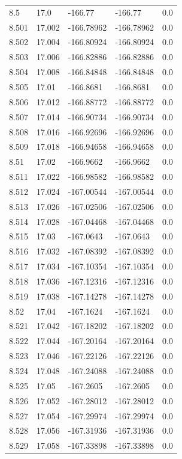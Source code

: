 \begin{tabular}{lllll}
8.5 & 17.0 & -166.77 & -166.77 & 0.0 \\
8.501 & 17.002 & -166.78962 & -166.78962 & 0.0 \\
8.502 & 17.004 & -166.80924 & -166.80924 & 0.0 \\
8.503 & 17.006 & -166.82886 & -166.82886 & 0.0 \\
8.504 & 17.008 & -166.84848 & -166.84848 & 0.0 \\
8.505 & 17.01 & -166.8681 & -166.8681 & 0.0 \\
8.506 & 17.012 & -166.88772 & -166.88772 & 0.0 \\
8.507 & 17.014 & -166.90734 & -166.90734 & 0.0 \\
8.508 & 17.016 & -166.92696 & -166.92696 & 0.0 \\
8.509 & 17.018 & -166.94658 & -166.94658 & 0.0 \\
8.51 & 17.02 & -166.9662 & -166.9662 & 0.0 \\
8.511 & 17.022 & -166.98582 & -166.98582 & 0.0 \\
8.512 & 17.024 & -167.00544 & -167.00544 & 0.0 \\
8.513 & 17.026 & -167.02506 & -167.02506 & 0.0 \\
8.514 & 17.028 & -167.04468 & -167.04468 & 0.0 \\
8.515 & 17.03 & -167.0643 & -167.0643 & 0.0 \\
8.516 & 17.032 & -167.08392 & -167.08392 & 0.0 \\
8.517 & 17.034 & -167.10354 & -167.10354 & 0.0 \\
8.518 & 17.036 & -167.12316 & -167.12316 & 0.0 \\
8.519 & 17.038 & -167.14278 & -167.14278 & 0.0 \\
8.52 & 17.04 & -167.1624 & -167.1624 & 0.0 \\
8.521 & 17.042 & -167.18202 & -167.18202 & 0.0 \\
8.522 & 17.044 & -167.20164 & -167.20164 & 0.0 \\
8.523 & 17.046 & -167.22126 & -167.22126 & 0.0 \\
8.524 & 17.048 & -167.24088 & -167.24088 & 0.0 \\
8.525 & 17.05 & -167.2605 & -167.2605 & 0.0 \\
8.526 & 17.052 & -167.28012 & -167.28012 & 0.0 \\
8.527 & 17.054 & -167.29974 & -167.29974 & 0.0 \\
8.528 & 17.056 & -167.31936 & -167.31936 & 0.0 \\
8.529 & 17.058 & -167.33898 & -167.33898 & 0.0 \\

\end{tabular}
